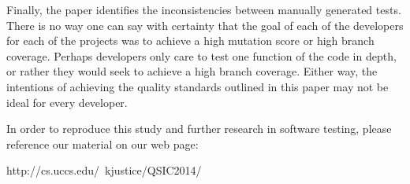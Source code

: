 Finally, the paper identifies the inconsistencies between manually generated tests. There is no way one can say with certainty that the goal of each of the developers for each of the projects was to achieve a high mutation score or high branch coverage. Perhaps developers only care to test one function of the code in depth, or rather they would seek to achieve a high branch coverage. Either way, the intentions of achieving the quality standards outlined in this paper may not be ideal for every developer. 

In order to reproduce this study and further research in software testing, please reference our material on our web page:

 http://cs.uccs.edu/~kjustice/QSIC2014/